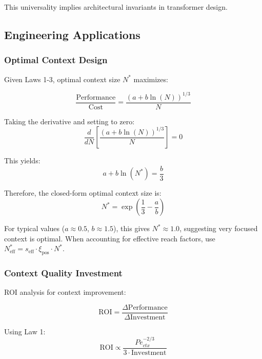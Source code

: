 \documentclass[conference]{IEEEtran}
\begin{document}
This universality implies architectural invariants in transformer design.

\subsection{Engineering Applications}

\subsubsection{Optimal Context Design}

Given Laws 1-3, optimal context size $N^*$ maximizes:

\begin{equation}
\frac{\text{Performance}}{\text{Cost}} = \frac{(a + b\ln(N))^{1/3}}{N}
\end{equation}

Taking the derivative and setting to zero:
\begin{equation}
\frac{d}{dN}\left[\frac{(a + b\ln(N))^{1/3}}{N}\right] = 0
\end{equation}

This yields:
\begin{equation}
a + b\ln(N^*) = \frac{b}{3}
\end{equation}

Therefore, the closed-form optimal context size is:
\begin{equation}
\boxed{N^* = \exp\left(\frac{1}{3} - \frac{a}{b}\right)}
\end{equation}

For typical values ($a \approx 0.5$, $b \approx 1.5$), this gives $N^* \approx 1.0$, suggesting very focused context is optimal. When accounting for effective reach factors, use $N_{\text{eff}}^* = s_{\text{eff}} \cdot \xi_{\text{pos}} \cdot N^*$.

\subsubsection{Context Quality Investment}

ROI analysis for context improvement:

\begin{equation}
\text{ROI} = \frac{\Delta \text{Performance}}{\Delta \text{Investment}}
\end{equation}

Using Law 1:
\begin{equation}
\text{ROI} \propto \frac{Pe_{ctx}^{-2/3}}{3 \cdot \text{Investment}}
\end{equation}
\end{document}

